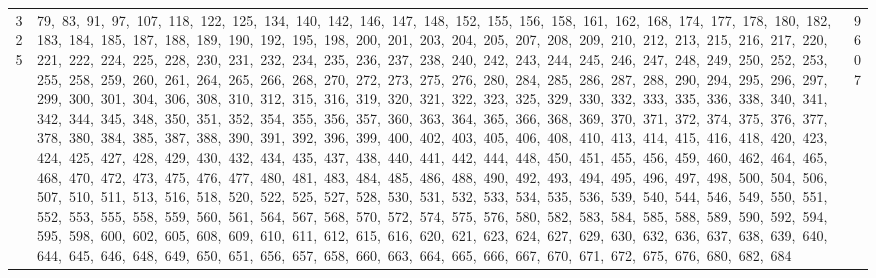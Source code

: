 \begin{longtable}{c|p{}|r}
325 & 79,\ 83,\ 91,\ 97,\ 107,\ 118,\ 122,\ 125,\ 134,\ 140,\ 142,\ 146,\ 147,\ 148,\ 152,\ 155,\ 156,\ 158,\ 161,\ 162,\ 168,\ 174,\ 177,\ 178,\ 180,\ 182,\ 183,\ 184,\ 185,\ 187,\ 188,\ 189,\ 190,\ 192,\ 195,\ 198,\ 200,\ 201,\ 203,\ 204,\ 205,\ 207,\ 208,\ 209,\ 210,\ 212,\ 213,\ 215,\ 216,\ 217,\ 220,\ 221,\ 222,\ 224,\ 225,\ 228,\ 230,\ 231,\ 232,\ 234,\ 235,\ 236,\ 237,\ 238,\ 240,\ 242,\ 243,\ 244,\ 245,\ 246,\ 247,\ 248,\ 249,\ 250,\ 252,\ 253,\ 255,\ 258,\ 259,\ 260,\ 261,\ 264,\ 265,\ 266,\ 268,\ 270,\ 272,\ 273,\ 275,\ 276,\ 280,\ 284,\ 285,\ 286,\ 287,\ 288,\ 290,\ 294,\ 295,\ 296,\ 297,\ 299,\ 300,\ 301,\ 304,\ 306,\ 308,\ 310,\ 312,\ 315,\ 316,\ 319,\ 320,\ 321,\ 322,\ 323,\ 325,\ 329,\ 330,\ 332,\ 333,\ 335,\ 336,\ 338,\ 340,\ 341,\ 342,\ 344,\ 345,\ 348,\ 350,\ 351,\ 352,\ 354,\ 355,\ 356,\ 357,\ 360,\ 363,\ 364,\ 365,\ 366,\ 368,\ 369,\ 370,\ 371,\ 372,\ 374,\ 375,\ 376,\ 377,\ 378,\ 380,\ 384,\ 385,\ 387,\ 388,\ 390,\ 391,\ 392,\ 396,\ 399,\ 400,\ 402,\ 403,\ 405,\ 406,\ 408,\ 410,\ 413,\ 414,\ 415,\ 416,\ 418,\ 420,\ 423,\ 424,\ 425,\ 427,\ 428,\ 429,\ 430,\ 432,\ 434,\ 435,\ 437,\ 438,\ 440,\ 441,\ 442,\ 444,\ 448,\ 450,\ 451,\ 455,\ 456,\ 459,\ 460,\ 462,\ 464,\ 465,\ 468,\ 470,\ 472,\ 473,\ 475,\ 476,\ 477,\ 480,\ 481,\ 483,\ 484,\ 485,\ 486,\ 488,\ 490,\ 492,\ 493,\ 494,\ 495,\ 496,\ 497,\ 498,\ 500,\ 504,\ 506,\ 507,\ 510,\ 511,\ 513,\ 516,\ 518,\ 520,\ 522,\ 525,\ 527,\ 528,\ 530,\ 531,\ 532,\ 533,\ 534,\ 535,\ 536,\ 539,\ 540,\ 544,\ 546,\ 549,\ 550,\ 551,\ 552,\ 553,\ 555,\ 558,\ 559,\ 560,\ 561,\ 564,\ 567,\ 568,\ 570,\ 572,\ 574,\ 575,\ 576,\ 580,\ 582,\ 583,\ 584,\ 585,\ 588,\ 589,\ 590,\ 592,\ 594,\ 595,\ 598,\ 600,\ 602,\ 605,\ 608,\ 609,\ 610,\ 611,\ 612,\ 615,\ 616,\ 620,\ 621,\ 623,\ 624,\ 627,\ 629,\ 630,\ 632,\ 636,\ 637,\ 638,\ 639,\ 640,\ 644,\ 645,\ 646,\ 648,\ 649,\ 650,\ 651,\ 656,\ 657,\ 658,\ 660,\ 663,\ 664,\ 665,\ 666,\ 667,\ 670,\ 671,\ 672,\ 675,\ 676,\ 680,\ 682,\ 684 & 9607 \\

\end{longtable}
